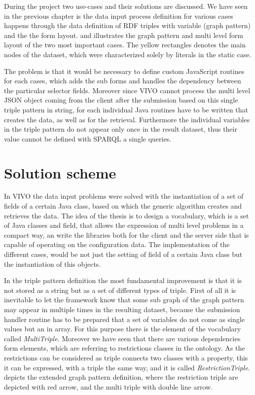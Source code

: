 During the project two use-cases and their solutions are discussed. We have seen in the previous chapter is the data input process definition for various cases happens through the data definition of RDF triples with variable (graph pattern) and the the form layout.  and  illustrates the graph pattern and multi level form layout of the two most important cases. The yellow rectangles denotes the main nodes of the dataset, which were characterized solely by literals in the static case.



The problem is that it would be necessary to define custom JavaScript routines for each cases, which adds the sub forms and handles the dependency between the particular selector fields. Moreover since VIVO cannot process the multi level JSON object coming from the client after the submission based on this single triple pattern in string, for each individual Java routines have to be written that creates the data, as well as for the retrieval. Furthermore the individual variables in the triple pattern do not appear only once in the result dataset, thus their value cannot be defined with SPARQL a single queries.


\section{Solution scheme}

In VIVO the data input problems were solved with the instantiation of a set of fields of a certain Java class, based on which the generic algorithm creates and retrieves the data. The idea of the thesis is to design a vocabulary, which is a set of Java classes and field, that allows the expression of multi level problems in a compact way, an write the libraries both for the client and the server side that is capable of operating on the configuration data. The implementation of the different cases, would be not just the setting of field of a certain Java class but the instantiation of this objects. 

In the triple pattern definition the most fundamental improvement is that it is not stored as a string but as a set of different types of triple. First of all it is inevitable to let the framework know that some sub graph of the graph pattern may appear in multiple times in the resulting dataset, because the submission handler routine has to be prepared that a set of variables do not come as single values but an in array. For this purpose there is the element of the vocabulary called \textit{MultiTriple}. Moreover we have seen that there are various dependencies form elements, which are referring to restrictions classes in the ontology. As the restrictions can be considered as triple connects two classes with a property, this it can be expressed, with a triple the same way, and it is called \textit{RestrictionTriple}.  depicts the extended graph pattern definition, where the restriction triple are depicted with red arrow, and the multi triple with double line arrow.

